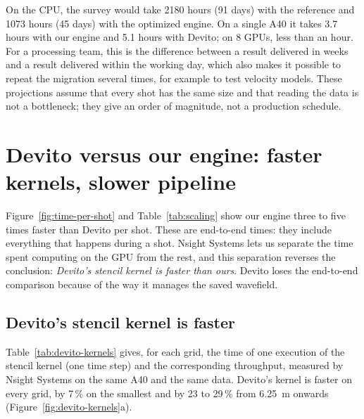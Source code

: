 \documentclass[letterpaper,11pt,leqno]{article}
\begin{document}
On the CPU, the survey would take 2180 hours (91 days) with the reference and
1073 hours (45 days) with the optimized engine. On a single A40 it takes 3.7 hours
with our engine and 5.1 hours with Devito; on 8 GPUs, less than an hour. For a
processing team, this is the difference between a result delivered in weeks and
a result delivered within the working day, which also makes it possible to repeat
the migration several times, for example to test velocity models. These
projections assume that every shot has the same size and that reading the data
is not a bottleneck; they give an order of magnitude, not a production schedule.

\section{Devito versus our engine: faster kernels, slower pipeline}\label{s:devito}

Figure~\ref{fig:time-per-shot} and Table~\ref{tab:scaling} show our engine three
to five times faster than Devito per shot. These are end-to-end times: they
include everything that happens during a shot. Nsight Systems lets us separate
the time spent computing on the GPU from the rest, and this separation reverses
the conclusion: \emph{Devito's stencil kernel is faster than ours}. Devito loses
the end-to-end comparison because of the way it manages the saved wavefield.

\subsection{Devito's stencil kernel is faster}

Table~\ref{tab:devito-kernels} gives, for each grid, the time of one execution of
the stencil kernel (one time step) and the corresponding throughput, measured by
Nsight Systems on the same A40 and the same data. Devito's kernel is faster on
every grid, by 7\,\% on the smallest and by 23 to 29\,\% from 6.25~m onwards
(Figure~\ref{fig:devito-kernels}a).
\end{document}
